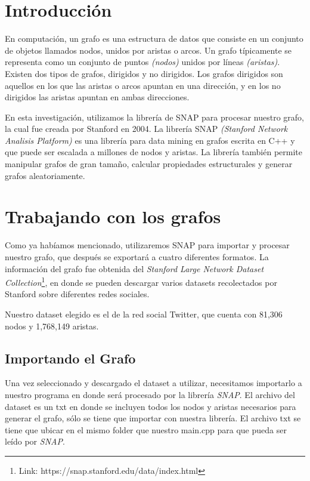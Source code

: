 \documentclass{sig-alternate-05-2015}
\begin{document}

\section{Introducción}
En computación, un grafo es una estructura de datos que consiste en un conjunto de objetos llamados nodos, unidos por aristas o arcos. Un grafo típicamente se representa como un conjunto de puntos \textit{(nodos)} unidos por líneas \textit{(aristas)}. Existen dos tipos de grafos, dirigidos y no dirigidos. Los grafos dirigidos son aquellos en los que las aristas o arcos apuntan en una dirección, y en los no dirigidos las aristas apuntan en ambas direcciones.

En esta investigación, utilizamos la librería de SNAP para procesar nuestro grafo, la cual fue creada por Stanford en 2004. La librería SNAP \textit{(Stanford Network Analisis Platform)} es una librería para data mining en grafos escrita en C++ y que puede ser escalada a millones de nodos y aristas. La librería también permite manipular grafos de gran tamaño, calcular propiedades estructurales y generar grafos aleatoriamente.


\section{Trabajando con los grafos}
Como ya habíamos mencionado, utilizaremos SNAP para importar y procesar nuestro grafo, que después se exportará a cuatro diferentes formatos. La información del grafo fue obtenida del \textit{Stanford Large Network Dataset Collection}\footnote{Link: https://snap.stanford.edu/data/index.html}, en donde se pueden descargar varios datasets recolectados por Stanford sobre diferentes redes sociales. 

Nuestro dataset elegido es el de la red social Twitter, que cuenta con 81,306 nodos y 1,768,149 aristas. 


\subsection{Importando el Grafo}
Una vez seleccionado y descargado el dataset a utilizar, necesitamos importarlo a nuestro programa en donde será procesado por la librería \textit{SNAP}. El archivo del dataset es un txt en donde se incluyen todos los nodos y aristas necesarios para generar el grafo, sólo se tiene que importar con nuestra librería. El archivo txt se tiene que ubicar en el mismo folder que nuestro main.cpp para que pueda ser leído por \textit{SNAP}.
\end{document}
